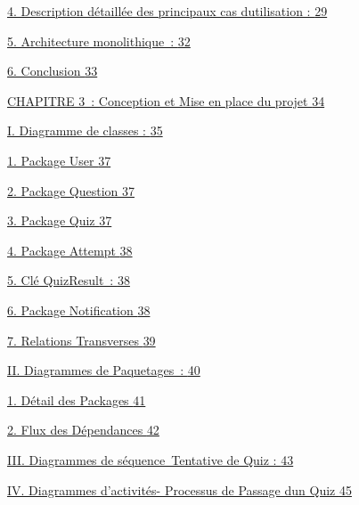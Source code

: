 \documentclass[12pt,a4paper,twoside]{report}
\begin{document}
\protect\hyperlink{description-duxe9tailluxe9e-des-principaux-cas-dutilisation}{4.
Description détaillée des principaux cas d\textquotesingle utilisation :
\protect\hyperlink{description-duxe9tailluxe9e-des-principaux-cas-dutilisation}{29}}

\protect\hyperlink{architecture-monolithique}{5. Architecture
monolithique~: \protect\hyperlink{architecture-monolithique}{32}}

\protect\hyperlink{conclusion-1}{6. Conclusion
\protect\hyperlink{conclusion-1}{33}}

\protect\hyperlink{section-3}{CHAPITRE 3~: Conception et Mise en place
du projet \protect\hyperlink{section-3}{34}}

\protect\hyperlink{diagramme-de-classes}{I. Diagramme de classes :
\protect\hyperlink{diagramme-de-classes}{35}}

\protect\hyperlink{package-user}{1. Package User
\protect\hyperlink{package-user}{37}}

\protect\hyperlink{package-question}{2. Package Question
\protect\hyperlink{package-question}{37}}

\protect\hyperlink{package-quiz}{3. Package Quiz
\protect\hyperlink{package-quiz}{37}}

\protect\hyperlink{package-attempt}{4. Package Attempt
\protect\hyperlink{package-attempt}{38}}

\protect\hyperlink{cluxe9-quizresult}{5. Clé QuizResult~:
\protect\hyperlink{cluxe9-quizresult}{38}}

\protect\hyperlink{package-notification}{6. Package Notification
\protect\hyperlink{package-notification}{38}}

\protect\hyperlink{relations-transverses}{7. Relations Transverses
\protect\hyperlink{relations-transverses}{39}}

\protect\hyperlink{diagrammes-de-paquetages}{II. Diagrammes de
Paquetages~: \protect\hyperlink{diagrammes-de-paquetages}{40}}

\protect\hyperlink{duxe9tail-des-packages}{1. Détail des Packages
\protect\hyperlink{duxe9tail-des-packages}{41}}

\protect\hyperlink{flux-des-duxe9pendances}{2. Flux des Dépendances
\protect\hyperlink{flux-des-duxe9pendances}{42}}

\protect\hyperlink{diagrammes-de-suxe9quence-tentative-de-quiz}{III.
Diagrammes de séquence~Tentative de Quiz :
\protect\hyperlink{diagrammes-de-suxe9quence-tentative-de-quiz}{43}}

\protect\hyperlink{diagrammes-dactivituxe9s--processus-de-passage-dun-quiz}{IV.
Diagrammes d'activités- Processus de Passage d\textquotesingle un Quiz
\protect\hyperlink{diagrammes-dactivituxe9s--processus-de-passage-dun-quiz}{45}}
\end{document}
